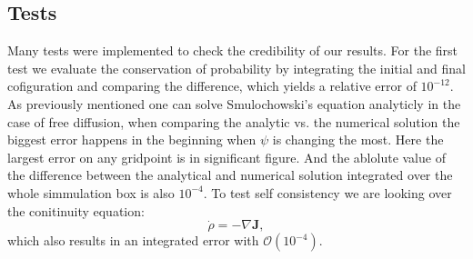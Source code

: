 \documentclass[a4paper]{article}
\renewcommand\vec[1]{\mathbf{#1}}
\begin{document}
\subsection{Tests}
Many tests were implemented to check the credibility of our results. For the first test we evaluate the conservation of probability by integrating the initial and final cofiguration and comparing the difference, which yields a relative error of $10^{-12}$.
As previously mentioned one can solve Smulochowski's equation analyticly in the case of free diffusion, when comparing the analytic vs. the numerical solution the biggest error happens in the beginning when $\psi$ is changing the most. Here the largest error on any gridpoint is in  significant figure. And  the ablolute value of the difference between the analytical and numerical solution integrated over the whole simmulation box is also $10^{-4}$.  
To test self consistency we are looking over the conitinuity equation:
\begin{equation}
	\dot{\rho}=- \nabla \vec{J},
	\label{eq:coninuity}
\end{equation}
which also results in an integrated error with $\mathcal{O} (10^{-4})$.  
\end{document}
